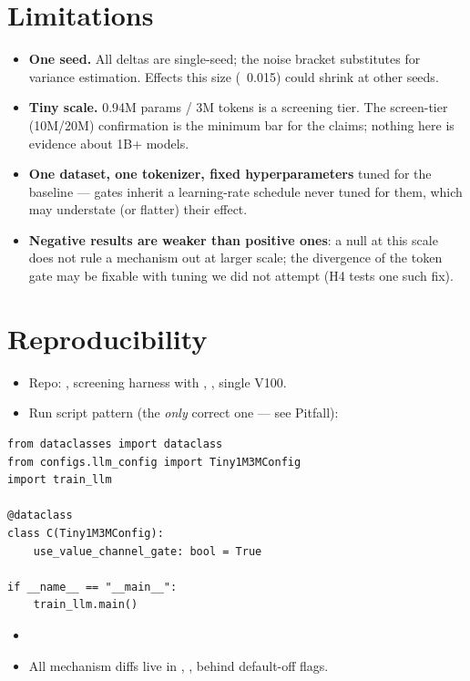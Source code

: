 \documentclass[11pt,a4paper]{article}
\begin{document}
\section{Limitations}

\begin{itemize}
\item \textbf{One seed.} All deltas are single-seed; the noise bracket substitutes for variance estimation. Effects this size (~0.015) could shrink at other seeds.
\item \textbf{Tiny scale.} 0.94M params / 3M tokens is a screening tier. The screen-tier (10M/20M) confirmation is the minimum bar for the claims; nothing here is evidence about 1B+ models.
\item \textbf{One dataset, one tokenizer, fixed hyperparameters} tuned for the baseline --- gates inherit a learning-rate schedule never tuned for them, which may understate (or flatter) their effect.
\item \textbf{Negative results are weaker than positive ones}: a null at this scale does not rule a mechanism out at larger scale; the divergence of the token gate may be fixable with tuning we did not attempt (H4 tests one such fix).
\end{itemize}

\section{Reproducibility}

\begin{itemize}
\item Repo: \texttt{}, screening harness \texttt{} with \texttt{}, \texttt{}, single V100.
\item Run script pattern (the \emph{only} correct one --- see Pitfall):
\end{itemize}

\begin{verbatim}
from dataclasses import dataclass
from configs.llm_config import Tiny1M3MConfig
import train_llm

@dataclass
class C(Tiny1M3MConfig):
    use_value_channel_gate: bool = True

if __name__ == "__main__":
    train_llm.main()
\end{verbatim}

\begin{itemize}
\item \texttt{}
\item All mechanism diffs live in \texttt{}, \texttt{}, \texttt{} behind default-off flags.
\end{itemize}
\end{document}
